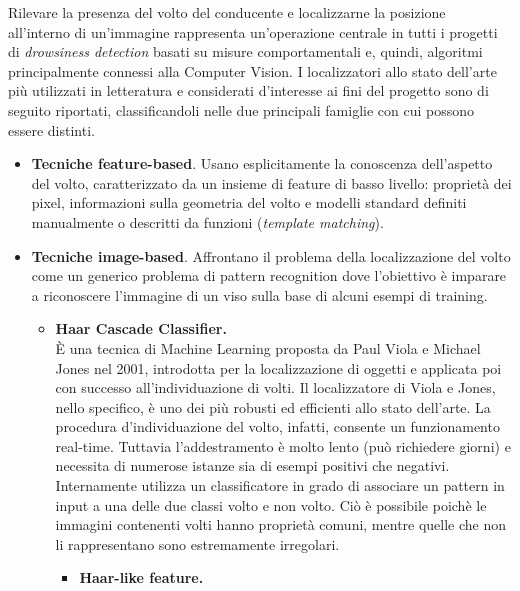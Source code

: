 \documentclass[12pt]{article}
\begin{document}
Rilevare la presenza del volto del conducente e localizzarne la posizione all'interno di un'immagine rappresenta un'operazione centrale in tutti i progetti di \textit{drowsiness detection} basati su misure comportamentali e, quindi, algoritmi principalmente connessi alla Computer Vision. I localizzatori allo stato dell'arte più utilizzati in letteratura e considerati d'interesse ai fini del progetto sono di seguito riportati, classificandoli nelle due principali famiglie con cui possono essere distinti.
\begin{itemize}
	\item \textbf{Tecniche feature-based}. Usano esplicitamente la conoscenza dell'aspetto del volto, caratterizzato da un insieme di feature di basso livello: proprietà dei pixel, informazioni sulla geometria del volto e modelli standard definiti manualmente o descritti da funzioni (\textit{template matching}).
	\item \textbf{Tecniche image-based}. Affrontano il problema della localizzazione del volto come un generico problema di pattern recognition dove l'obiettivo è imparare a riconoscere l'immagine di un viso sulla base di alcuni esempi di training.
	\begin{itemize}
		\item \textbf{Haar Cascade Classifier.}\\
		È una tecnica di Machine Learning proposta da Paul Viola e Michael Jones nel 2001\cite{Haar}, introdotta per la localizzazione di oggetti e applicata poi con successo all'individuazione di volti. Il localizzatore di Viola e Jones, nello specifico, è uno dei più robusti ed efficienti allo stato dell'arte. La procedura d'individuazione del volto, infatti, consente un funzionamento real-time. Tuttavia l'addestramento è molto lento (può richiedere giorni) e necessita di numerose istanze sia di esempi positivi che negativi.
		Internamente utilizza un classificatore in grado di associare un pattern in input a una delle due classi volto e non volto. Ciò è possibile poichè le immagini contenenti volti hanno proprietà comuni, mentre quelle che non li rappresentano sono estremamente irregolari.
		\begin{itemize}
			\item \textbf{Haar-like feature.}\\

\end{itemize}
\end{itemize}
\end{itemize}
\end{document}
